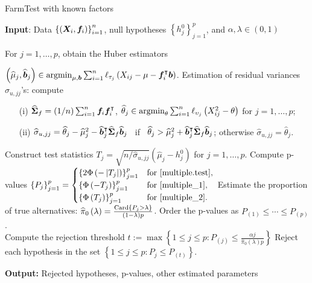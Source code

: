 \begin{algorithm}[!t]
\caption{FarmTest with known factors \citep{ZBFL2017}} \label{alg1}
\hspace*{\algorithmicindent}   \hspace{-0.5cm} \textbf{Input}: Data 
$\left\{ \left( \bX_i , \bff_i \right) \right\}_{i=1}^n$, null hypotheses $\left\{h^0_j\right\}_{j=1}^p$, and $\alpha, \lambda \in \left(0,1\right)$
\begin{algorithmic}[1]
\STATE For $j = 1, \ldots, p$, obtain the Huber estimators 

$ \left( \hat{\mu}_j  , \hat{\bb}_j  \right)  \in  \argmin_{  \mu, \bb    } \sn \ell_{\tau_j}\left( X_{ij}    -    \mu -  \bff_i^\T \bb \right) $.
\STATE Estimation of residual variances $\sigma_{u,jj}$'s: compute 
\begin{enumerate}
\item[(i)] $\hat{\bSigma}_f = \left(1/n\right) \sn \bff_i \bff_i^\intercal$, $\hat{\theta}_{j}  \in  \argmin_{ \theta } \sn \ell_{\upsilon_j   }\left( X^2_{ij}    -    \theta\right)$ for $j=1,\ldots,p$;
\item[(ii)] $\hat{\sigma}_{u, jj} =    \hat{\theta}_j-\hat{\mu}^2_j    -  \hat{\bb}_j^\intercal \hat{\bSigma}_f  \hat{\bb}_j$ ~if~ $\hat \theta_j  > \hat{\mu}^2_j    +  \hat{\bb}_j^\intercal \hat{\bSigma}_f  \hat{\bb}_j  $; otherwise $\hat{\sigma}_{u, jj} = \hat{\theta}_j $.
\end{enumerate}
\STATE Construct test statistics $T_j  =  \sqrt{n/ \hat{\sigma}_{u,jj}}  \left(\hat{\mu}_{j}-h^0_j \right)$ for $j=1,\ldots, p$.
\STATE Compute p-values $\left\{ P_j \right\}_{j=1}^p= \begin{cases}
 \left\{2\Phi\left(-\left|T_j\right|\right) \right\}_{j=1}^p & \text{for \eqref{multiple.test}}, \\
  \left\{\Phi\left(-T_j\right) \right\}_{j=1}^p& \text{for \eqref{multiple_1}}, \\
  \left\{\Phi\left(T_j\right) \right\}_{j=1}^p& \text{for \eqref{multiple_2}}.
  \end{cases}$
\STATE Estimate the proportion of true alternatives: $\hat \pi_0\left(\lambda\right)=\frac{{\rm Card} \left\{P_j > \lambda \right\}}{\left(1-\lambda \right)p}$.
\STATE  Order the p-values  as $P_{\left(1\right)}\leq \cdots \leq P_{\left(p\right)}$. 
\\ Compute the rejection threshold $t:=\max \left\{ 1 \leq j \leq p :  P_{\left(j\right)} \leq \frac{\alpha j}{\hat \pi_0\left(\lambda\right) p} \right\}$
\STATE Reject each hypothesis in the set $\left\{ 1\leq j \leq p :  P_j \leq P_{\left(t\right)}\right\}$.
\end{algorithmic}
 \hspace*{\algorithmicindent}  \hspace{-0.5cm}  \textbf{Output:} Rejected hypotheses, p-values, other estimated parameters
 \end{algorithm}


